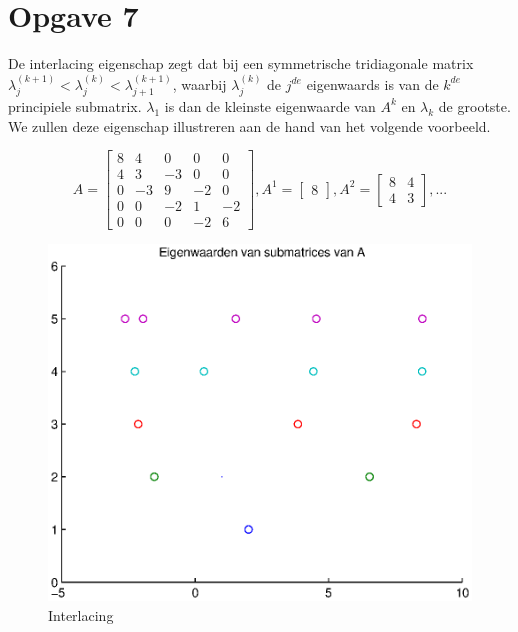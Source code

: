 \documentclass[]{article}
\newcommand{\opgave}[1]{\section*{Opgave #1}}
\begin{document}
\opgave7


De interlacing eigenschap zegt dat bij een symmetrische tridiagonale matrix $\lambda ^{(k+1)}_{j} < \lambda ^{(k)}_{j} < \lambda ^{(k+1)}_{j+1}$, waarbij $\lambda ^{(k)}_{j}$ de $j^{de}$ eigenwaards is van de $k^{de}$ principiele submatrix. $\lambda _{1}$ is dan de kleinste eigenwaarde van $A^{k}$ en $\lambda _{k}$ de grootste. We zullen deze eigenschap illustreren aan de hand van het volgende voorbeeld.

\begin{equation}
A=\begin{bmatrix}
    	8 & 4 & 0 & 0 & 0	\\
    	4 & 3 & -3 & 0 & 0 \\
    	0 & -3 & 9 & -2 & 0 \\
    	0 & 0 & -2 & 1 & -2 \\
    	0 & 0 & 0 & -2 & 6 
    \end{bmatrix}
    ,
    A^{1}=\begin{bmatrix}
        	8
        \end{bmatrix}
        ,
    A^{2}=\begin{bmatrix}
           	8 & 4 \\
           	4 & 3
         \end{bmatrix}
         , ...
\end{equation}
\begin{figure}
\noindent \includegraphics[width=1\linewidth]{Opgave7.eps}
\caption{Interlacing}
\label{figuurtje}
\end{figure}
\end{document}
